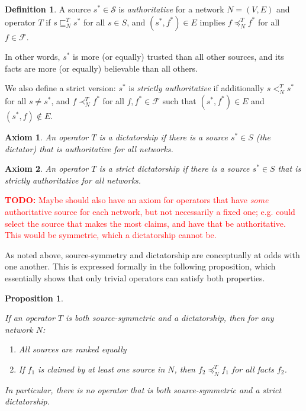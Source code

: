 \documentclass{article}
\theoremstyle{definition} \newtheorem{definition}{Definition}
\theoremstyle{definition} \newtheorem{example}{Example}
\theoremstyle{plain} \newtheorem{axiom}{Axiom}
\theoremstyle{plain} \newtheorem*{remark}{Remark}
\theoremstyle{remark} \newtheorem*{notation}{Notation}
\theoremstyle{plain} \newtheorem{lemma}{Lemma}
\theoremstyle{plain} \newtheorem{proposition}{Proposition}
\newcommand{\todo}[1] {
    \textcolor{red}{
        \textbf{TODO:} #1
    }
}
\renewcommand{\S}{\mathcal{S}}  %
\newcommand{\F}{\mathcal{F}}
\newcommand{\sle}{\sqsubseteq}
\newcommand{\slt}{<}
\newcommand{\fle}{\preceq}
\newcommand{\flt}{\prec}
\begin{document}
\begin{definition}

A source $s^* \in \S$ is \emph{authoritative} for a network $N=(V, E)$ and
operator $T$ if $s \sle_N^T s^*$ for all $s \in S$, and $(s^*, f^*) \in E$
implies $f \fle_N^T f^*$ for all $f \in \F$.

In other words, $s^*$ is more (or equally) trusted than all other sources, and
its facts are more (or equally) believable than all others.

We also define a strict version: $s^*$ is \emph{strictly authoritative} if
additionally $s \slt_N^T s^*$ for all $s \ne s^*$, and $f \flt_N^T f^*$ for all
$f, f^* \in \F$ such that $(s^*, f^*) \in E$ and $(s^*, f) \notin E$.

\end{definition}

\begin{axiom}
\label{axiom:dict}
An operator $T$ is a \emph{dictatorship} if there is a source $s^* \in S$ (the
dictator) that is authoritative for all networks.
\end{axiom}

\begin{axiom}
\label{axiom:strict_dict}
An operator $T$ is a \emph{strict dictatorship} if there is a source $s^* \in
S$ that is strictly authoritative for all networks.
\end{axiom}

\todo{
    Maybe should also have an axiom for operators that have \emph{some}
    authoritative source for each network, but not necessarily a fixed one;
    e.g. could select the source that makes the most claims, and have that be
    authoritative. This would be symmetric, which a dictatorship cannot be.
}

As noted above, source-symmetry and dictatorship are conceptually at odds with
one another. This is expressed formally in the following proposition, which
essentially shows that only trivial operators can satisfy both properties.

\begin{proposition}
\label{prop:symm_and_dict}

If an operator $T$ is both source-symmetric and a dictatorship, then for any
network $N$:
\begin{enumerate}
\item All sources are ranked equally
\item If $f_1$ is claimed by at least one source in $N$, then $f_2 \fle_N^T
f_1$ for all facts $f_2$.
\end{enumerate}

In particular, there is no operator that is both source-symmetric and a strict
dictatorship.
\end{proposition}
\end{document}
